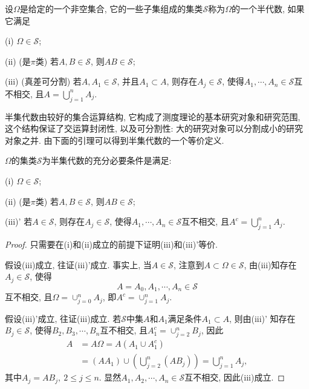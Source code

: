 \begin{definition}[半(集)代数]
	设$\Omega$是给定的一个非空集合, 它的一些子集组成的集类$\mathscr{S}$称为$\Omega$的一个半代数, 如果它满足
	\begin{blist}
		\item[(i)] $\Omega\in\mathscr{S}$;
		\item[(ii)] (是$\pi$类) 若$A,B\in\mathscr{S}$, 则$AB\in\mathscr{S}$;
		\item[(iii)] (真差可分割) 若$A,A_1\in\mathscr{S}$, 并且$A_1\subset A$, 则存在$A_j\in\mathscr{S}$, 使得$A_1,\cdots,A_n\in\mathscr{S}$互不相交, 且$A = \bigcup_{j=1}^nA_j$.
	\end{blist}
\end{definition}
半集代数由较好的集合运算结构, 它构成了测度理论的基本研究对象和研究范围, 这个结构保证了交运算封闭性, 以及可分割性: 大的研究对象可以分割成小的研究对象之并. 由下面的引理可以得到半集代数的一个等价定义.

\begin{lemma}
	$\Omega$的集类$\mathscr{S}$为半集代数的充分必要条件是满足:
	\begin{blist}
		\item[(i)] $\Omega\in\mathscr{S}$;
		\item[(ii)] (是$\pi$类) 若$A,B\in\mathscr{S}$, 则$AB\in\mathscr{S}$;
		\item[(iii)'] 若$A\in\mathscr{S}$,  则存在$A_j\in\mathscr{S}$, 使得$A_1,\cdots,A_n\in\mathscr{S}$互不相交, 且$A^c = \bigcup_{j=1}^nA_j$.
	\end{blist}
\end{lemma}
\begin{proof}
	只需要在(i)和(ii)成立的前提下证明(iii)和(iii)'等价.
	
	假设(iii)成立, 往证(iii)'成立. 事实上, 当$A\in\mathscr{S}$, 注意到$A\subset\Omega\in\mathscr{S}$, 由(iii)知存在$A_j\in\mathscr{S}$, 使得
	\begin{equation}
	A = A_0,A_1,\cdots,A_n\in\mathscr{S}
	\end{equation}
	互不相交, 且$\Omega = \cup_{j=0}^nA_j$, 即$A^c=\cup_{j=1}^nA_j$.
	
	假设(iii)'成立, 往证(iii)成立. 若$\mathscr{S}$中集$A$和$A_1$满足条件$A_1\subset A$, 则由(iii)' 知存在$B_j\in\mathscr{S}$, 使得$B_2,B_3,\cdots,B_n$互不相交, 且$A_1^c = \cup_{j=2}^nB_j$, 因此
	\begin{align}
	A&= A\Omega = A(A_1\cup A_1^c)\nonumber\\
	&= (AA_1)\cup\left( \bigcup_{j=2}^n(AB_j) \right) = \bigcup_{j=1}^nA_j,
	\end{align}
	其中$A_j = AB_j,~2\leqslant j\leqslant n$. 显然$A_1,A_2,\cdots,A_n\in\mathscr{S}$互不相交, 因此(iii)成立.
\end{proof}

